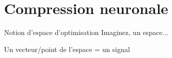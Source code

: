 \documentclass[9pt, aspectratio=169]{beamer}
\begin{document}
\section{Compression neuronale}

\begin{frame}{} %
\begin{center}
\Huge \insertsection
\end{center}
\end{frame}


\begin{frame}{Notion d'espace d'optimisation} %
Imaginez, un espace...
\begin{figure}
\end{figure}

Un vecteur/point de l'espace = un signal

\end{frame}
\end{document}
